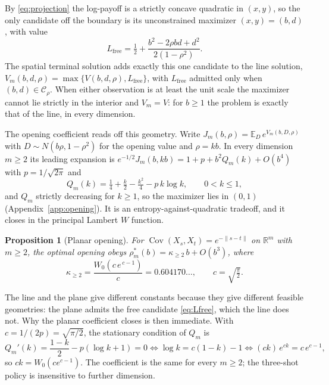 \documentclass[11pt]{article}
\theoremstyle{itheads}
\newtheorem{proposition}{Proposition}
\newcommand{\E}{\mathbb{E}}
\newcommand{\R}{\mathbb{R}}
\begin{document}
By \eqref{eq:projection} the log-payoff is a strictly concave quadratic
in $(x,y)$, so the only candidate off the boundary is its unconstrained
maximizer $(x,y)=(b,d)$, with value
\begin{equation}\label{eq:Lfree}
L_{\mathrm{free}}=\tfrac12+\frac{b^{2}-2\rho bd+d^{2}}{2\left(1-\rho^{2}\right)}.
\end{equation}
The spatial terminal solution adds exactly this one candidate to the
line solution, $V_m(b,d,\rho)=\max\{V(b,d,\rho),L_{\mathrm{free}}\}$,
with $L_{\mathrm{free}}$ admitted only when $(b,d)\in\mathcal{C}_\rho$.
When either observation is at least the unit scale the maximizer
cannot lie strictly in the interior and $V_m=V$: for $b\ge 1$ the
problem is exactly that of the line, in every dimension.

The opening coefficient reads off this geometry. Write
$J_m(b,\rho)=\E_D\,e^{V_m(b,D,\rho)}$ with $D\sim N(b\rho,1-\rho^{2})$
for the opening value and $\rho=kb$. In every dimension $m\ge 2$ its
leading expansion is $e^{-1/2}J_m(b,kb)=1+p+b^{2}Q_m(k)+O(b^{4})$ with
$p=1/\sqrt{2\pi}$ and
\begin{equation}
Q_m(k)=\tfrac14+\tfrac{k}{2}-\tfrac{k^{2}}{4}-p\,k\log k,
\qquad 0<k\le 1,
\end{equation}
and $Q_m$ strictly decreasing for $k\ge 1$, so the maximizer lies in
$(0,1)$ (Appendix~\ref{app:opening}). It is an
entropy-against-quadratic tradeoff, and it closes in the principal
Lambert $W$ function.
\begin{proposition}[Planar opening]\label{prop:lambertw}
For $\operatorname{Cov}(X_s,X_t)=e^{-\|s-t\|}$ on $\R^{m}$ with
$m\ge 2$, the optimal opening obeys
$\rho_m^{*}(b)=\kappa_{\ge2}\,b+O(b^{3})$, where
\begin{equation}
\kappa_{\ge2}=\frac{W_0\!\left(c\,e^{\,c-1}\right)}{c}=0.604170\ldots,
\qquad c=\sqrt{\tfrac{\pi}{2}} .
\end{equation}
\end{proposition}

\noindent The line and the plane give different constants because they give
different feasible geometries: the plane admits the free candidate
\eqref{eq:Lfree}, which the line does not. Why the planar coefficient
closes is then immediate. With $c=1/(2p)=\sqrt{\pi/2}$, the stationary
condition of $Q_m$ is
\begin{equation}
Q_m'(k)=\frac{1-k}{2}-p(\log k+1)=0
\iff \log k=c(1-k)-1
\iff (ck)\,e^{ck}=c\,e^{c-1},
\end{equation}
so $ck=W_0(ce^{c-1})$. The coefficient is the same for every $m\ge 2$;
the three-shot policy is insensitive to further dimension.
\end{document}
